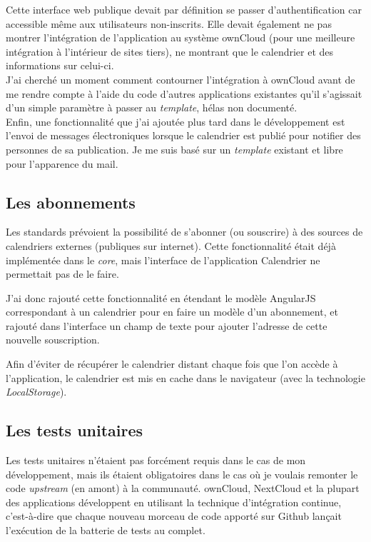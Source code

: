 \documentclass[10pt,a4paper, twoside]{report}
\begin{document}
	Cette interface web publique devait par définition se passer d'authentification car accessible même aux utilisateurs non-inscrits.
	Elle devait également ne pas montrer l'intégration de l'application au système ownCloud (pour une meilleure intégration à l'intérieur de sites tiers), ne montrant que le calendrier et des informations sur celui-ci.
	\\
	
	J'ai cherché un moment comment contourner l'intégration à ownCloud avant de me rendre compte à l'aide du code d'autres applications existantes qu'il s'agissait d'un simple paramètre à passer au \textit{template}, hélas non documenté.
	\\
	
	Enfin, une fonctionnalité que j'ai ajoutée plus tard dans le développement est l'envoi de messages électroniques lorsque le calendrier est publié pour notifier des personnes de sa publication. Je me suis basé sur un \textit{template} existant et libre pour l'apparence du mail.
	
	\subsection{Les abonnements}
	Les standards prévoient la possibilité de s'abonner (ou souscrire) à des sources de calendriers externes (publiques sur internet). Cette fonctionnalité était déjà implémentée dans le \textit{core}, mais l'interface de l'application Calendrier ne permettait pas de le faire. 
	
	J'ai donc rajouté cette fonctionnalité en étendant le modèle AngularJS correspondant à un calendrier pour en faire un modèle d'un abonnement, et rajouté dans l'interface un champ de texte pour ajouter l'adresse de cette nouvelle souscription. 
	
	Afin d'éviter de récupérer le calendrier distant chaque fois que l'on accède à l'application, le calendrier est mis en cache dans le navigateur (avec la technologie \textit{LocalStorage}).
	
	\subsection{Les tests unitaires}
	Les tests unitaires n'étaient pas forcément requis dans le cas de mon développement, mais ils étaient obligatoires dans le cas où je voulais remonter le code \textit{upstream} (en amont) à la communauté. ownCloud, NextCloud et la plupart des applications développent en utilisant la technique d'intégration continue, c'est-à-dire que chaque nouveau morceau de code apporté sur Github lançait l'exécution de la batterie de tests au complet. 
	
\end{document}
